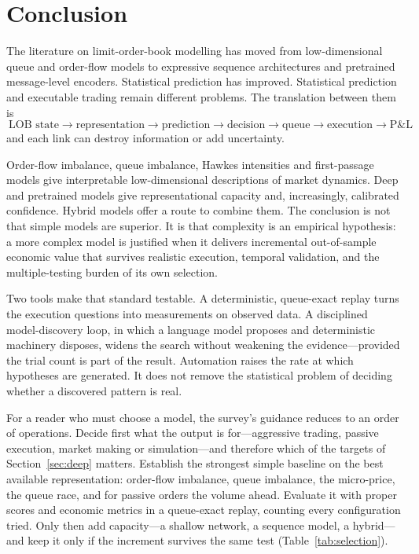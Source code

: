 \section{Conclusion}
\label{sec:conclusion}

The literature on limit-order-book modelling has moved from low-dimensional queue and order-flow
models to expressive sequence architectures and pretrained message-level encoders. Statistical
prediction has improved. Statistical prediction and executable trading remain different problems.
The translation between them is
\[
  \boxed{\ \text{LOB state} \to \text{representation} \to \text{prediction} \to \text{decision} \to
  \text{queue} \to \text{execution} \to \text{P\&L}\ }
\]
and each link can destroy information or add uncertainty.

Order-flow imbalance, queue imbalance, Hawkes intensities and first-passage models give
interpretable low-dimensional descriptions of market dynamics. Deep and pretrained models give
representational capacity and, increasingly, calibrated confidence. Hybrid models offer a route to
combine them. The conclusion is not that simple models are superior. It is that complexity is an
empirical hypothesis: a more complex model is justified when it delivers incremental out-of-sample
economic value that survives realistic execution, temporal validation, and the multiple-testing
burden of its own selection.

Two tools make that standard testable. A deterministic, queue-exact replay turns the execution
questions into measurements on observed data. A disciplined model-discovery loop, in which a
language model proposes and deterministic machinery disposes, widens the search without weakening
the evidence---provided the trial count is part of the result. Automation raises the rate at which
hypotheses are generated. It does not remove the statistical problem of deciding whether a
discovered pattern is real.

For a reader who must choose a model, the survey's guidance reduces to an order of operations.
Decide first what the output is for---aggressive trading, passive execution, market making or
simulation---and therefore which of the targets of Section~\ref{sec:deep} matters. Establish the
strongest simple baseline on the best available representation: order-flow imbalance, queue
imbalance, the micro-price, the queue race, and for passive orders the volume ahead. Evaluate it with
proper scores and economic metrics in a queue-exact replay, counting every configuration tried. Only
then add capacity---a shallow network, a sequence model, a hybrid---and keep it only if the increment
survives the same test (Table~\ref{tab:selection}).

